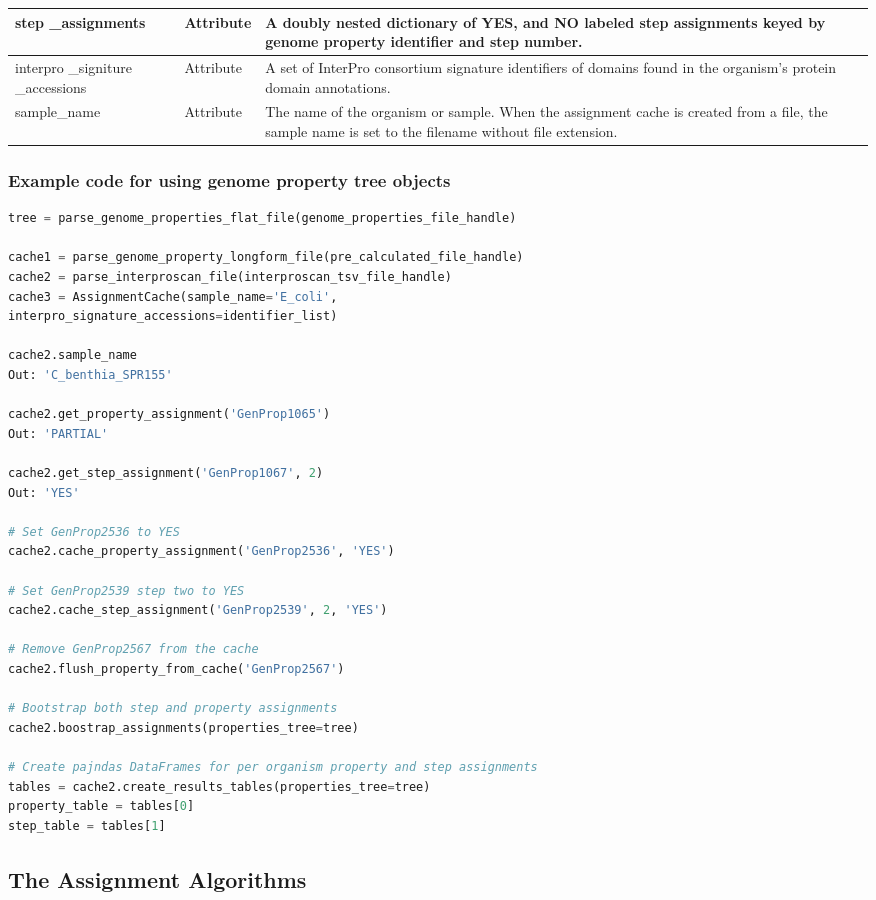 \begin{longtable}{|p{2.7cm}|p{2cm}|p{10cm}|}
step \_assignments & Attribute & A doubly nested dictionary of YES, and NO labeled step assignments keyed by genome property identifier and step number. \\ \hline
interpro \_signiture \_accessions & Attribute & A set of InterPro consortium signature identifiers of domains found in the organism's protein domain annotations. \\ \hline
sample\_name & Attribute & The name of the organism or sample. When the assignment cache is created from a file, the sample name is set to the filename without file extension. \\ \hline
\end{longtable}

\subsubsection{Example code for using genome property tree objects}

\begin{lstlisting}[language=Python]
tree = parse_genome_properties_flat_file(genome_properties_file_handle)

cache1 = parse_genome_property_longform_file(pre_calculated_file_handle)
cache2 = parse_interproscan_file(interproscan_tsv_file_handle)
cache3 = AssignmentCache(sample_name='E_coli', 
interpro_signature_accessions=identifier_list)

cache2.sample_name
Out: 'C_benthia_SPR155'

cache2.get_property_assignment('GenProp1065')
Out: 'PARTIAL'

cache2.get_step_assignment('GenProp1067', 2) 
Out: 'YES'

# Set GenProp2536 to YES
cache2.cache_property_assignment('GenProp2536', 'YES')

# Set GenProp2539 step two to YES
cache2.cache_step_assignment('GenProp2539', 2, 'YES')

# Remove GenProp2567 from the cache
cache2.flush_property_from_cache('GenProp2567')

# Bootstrap both step and property assignments
cache2.boostrap_assignments(properties_tree=tree)

# Create pajndas DataFrames for per organism property and step assignments
tables = cache2.create_results_tables(properties_tree=tree)
property_table = tables[0]
step_table = tables[1]

\end{lstlisting}

\subsection{The Assignment Algorithms}

